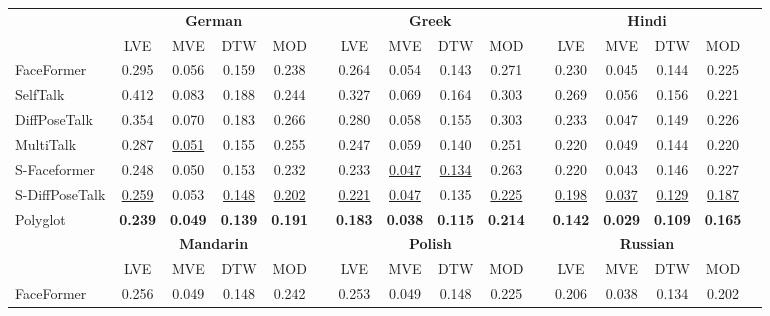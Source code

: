 \documentclass[a4paper, 10pt, conference]{ieeeconf}      %
\begin{document}
\begin{table}[ht!]
{\begin{tabular}{@{}l@{\hspace{0.1cm}}ccccccccccccccc@{}}
        \midrule
        \midrule

        & \multicolumn{4}{c}{\textbf{German}} & \phantom{abc} & \multicolumn{4}{c}{\textbf{Greek}} &
        \phantom{abc} & \multicolumn{4}{c}{\textbf{Hindi}} 
        \\
        \cmidrule{2-5} \cmidrule{7-10} \cmidrule{12-15} 
         & LVE  & MVE  & DTW  & MOD  && LVE  & MVE  & DTW  & MOD  && LVE  & MVE  & DTW  & MOD \\
        \midrule
        FaceFormer & 0.295 & 0.056 & 0.159 & 0.238 && 0.264 & 0.054 & 0.143 & 0.271 && 0.230 & 0.045 & 0.144 & 0.225  \\
        
        SelfTalk  & 0.412 & 0.083 & 0.188 & 0.244 && 0.327 & 0.069 & 0.164 & 0.303 && 0.269 & 0.056 & 0.156 & 0.221  \\

        DiffPoseTalk & 0.354 & 0.070 & 0.183 & 0.266 && 0.280 & 0.058 & 0.155 & 0.303 && 0.233 & 0.047 & 0.149 & 0.226  \\

        MultiTalk & 0.287 & \underline{0.051} & 0.155 & 0.255 && 0.247 & 0.059 & 0.140 & 0.251 && 0.220 & 0.049 & 0.144 & 0.220 \\
        
        \midrule

        S-Faceformer & 0.248 & 0.050 & 0.153 & 0.232 && 0.233 & \underline{0.047} & \underline{0.134} & 0.263 && 0.220 & 0.043 & 0.146 & 0.227 \\

        S-DiffPoseTalk & \underline{0.259} & 0.053 & \underline{0.148} & \underline{0.202} && \underline{0.221} & \underline{0.047} & 0.135 & \underline{0.225} && \underline{0.198} & \underline{0.037} & \underline{0.129} & \underline{0.187} \\
        
        \midrule

        Polyglot & \textbf{0.239} & \textbf{0.049} & \textbf{0.139} & \textbf{0.191} && \textbf{0.183} & \textbf{0.038} & \textbf{0.115} & \textbf{0.214} && \textbf{0.142} & \textbf{0.029} & \textbf{0.109} & \textbf{0.165} \\
        
        \midrule
        \midrule

        & \multicolumn{4}{c}{\textbf{Mandarin}} & \phantom{abc} & \multicolumn{4}{c}{\textbf{Polish}} &
        \phantom{abc} & \multicolumn{4}{c}{\textbf{Russian}} 
        \\
        \cmidrule{2-5} \cmidrule{7-10} \cmidrule{12-15} 
         & LVE  & MVE  & DTW  & MOD  && LVE  & MVE  & DTW  & MOD  && LVE  & MVE  & DTW  & MOD \\
        \midrule
        FaceFormer & 0.256 & 0.049 & 0.148 & 0.242 && 0.253 & 0.049 & 0.148 & 0.225 && 0.206 & 0.038 & 0.134 & 0.202  \\
        

\end{tabular}}
\end{table}
\end{document}
